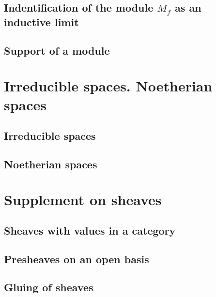         \subsection{Indentification of the module $M_f$ as an inductive limit}
        

        \subsection{Support of a module}
        

    \section{Irreducible spaces. Noetherian spaces}

        \subsection{Irreducible spaces}
        

        \subsection{Noetherian spaces}
        

    \section{Supplement on sheaves}

        \subsection{Sheaves with values in a category}
        

        \subsection{Presheaves on an open basis}
        

        \subsection{Gluing of sheaves}
        

